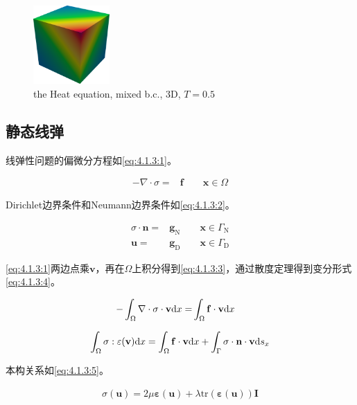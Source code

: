 \begin{figure}[!htbp]
  \centering
  \includegraphics[height=3cm]{fig/4/fig:1.1.1:2.png}
  \caption{   the Heat equation, mixed b.c., 3D, $T=0.5$}
  \label{fig:4.1.2:2}
\end{figure}


\subsection{静态线弹}

线弹性问题的偏微分方程如\eqref{eq:4.1.3:1}。

\begin{align}\label{eq:4.1.3:1}
  -\nabla\cdot\sigma=& \mathbf f  \qquad \mathbf x\in\Omega
\end{align}

Dirichlet边界条件和Neumann边界条件如\eqref{eq:4.1.3:2}。

\begin{subequations}\label{eq:4.1.3:2}
  \begin{align}
    \sigma\cdot\mathbf n =& \mathbf g_{\mathrm N} \qquad \mathbf x\in\Gamma_{\mathrm N}\\
    \mathbf u =& \mathbf g_{\mathrm D} \qquad \mathbf x\in\Gamma_{\mathrm D}
  \end{align}
\end{subequations}

\eqref{eq:4.1.3:1}两边点乘$\mathbf v$，再在$\Omega$上积分得到\eqref{eq:4.1.3:3}，通过散度定理得到变分形式\eqref{eq:4.1.3:4}。

\begin{align}\label{eq:4.1.3:3}
  -\int_{\Omega}\nabla\cdot\sigma\cdot\mathbf v\mathrm{d} x =& \int_{\Omega}\mathbf f\cdot\mathbf v\mathrm{d} x
\end{align}
  
\begin{align}\label{eq:4.1.3:4}
   \int_{\Omega}\sigma:\varepsilon(\mathbf v)\mathrm{d} x = \int_{\Omega}\mathbf f\cdot\mathbf v\mathrm{d} x + \int_{\Gamma}\sigma\cdot\mathbf n\cdot\mathbf v\mathrm{d} s_x
\end{align}

本构关系如\eqref{eq:4.1.3:5}。

\begin{align}\label{eq:4.1.3:5}
  \sigma(\mathbf u) = 2\mu\mathbf \varepsilon(\mathbf u) + \lambda\mathrm{tr}(\mathbf\varepsilon(\mathbf u))\mathbf I
\end{align}

